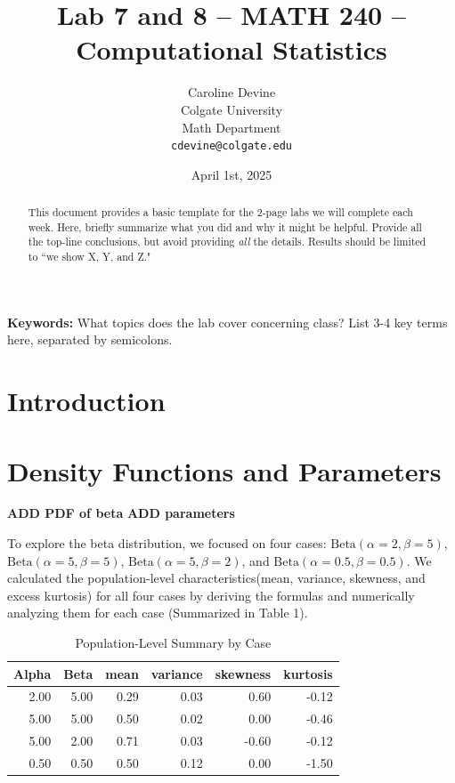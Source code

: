 \documentclass{article}\usepackage[]{graphicx}\usepackage[]{xcolor}
\begin{document}
\vspace{-1in}
\title{Lab 7 and 8 -- MATH 240 -- Computational Statistics}

\author{
  Caroline Devine \\
  Colgate University  \\
  Math Department  \\
  {\tt cdevine@colgate.edu}
}

\date{April 1st, 2025}

\maketitle

\begin{multicols}{2}
\begin{abstract}
This document provides a basic template for the 2-page labs we will complete each week. Here, briefly summarize what you did and why it might be helpful. Provide all the top-line conclusions, but avoid providing \emph{all} the details. Results should be limited to ``we show X, Y, and Z."
\end{abstract}

\noindent \textbf{Keywords:} What topics does the lab cover concerning class? List 3-4 key terms here, separated by semicolons.

\section{Introduction}



\section{Density Functions and Parameters}
\textbf{ADD PDF of beta}
\textbf{ADD parameters}

To explore the beta distribution, we focused on four cases: \(\text{Beta}(\alpha = 2, \beta = 5)\), \(\text{Beta}(\alpha = 5, \beta = 5)\), \(\text{Beta}(\alpha = 5, \beta = 2)\), and \(\text{Beta}(\alpha = 0.5, \beta = 0.5)\). We calculated the population-level characteristics(mean, variance, skewness, and excess kurtosis) for all four cases by deriving the formulas and numerically analyzing them for each case (Summarized in Table 1). 



\begin{table}[H]
\centering
\begingroup\small
\begin{tabular}{rrrrrr}
  \hline
Alpha & Beta & mean & variance & skewness & kurtosis \\ 
  \hline
2.00 & 5.00 & 0.29 & 0.03 & 0.60 & -0.12 \\ 
  5.00 & 5.00 & 0.50 & 0.02 & 0.00 & -0.46 \\ 
  5.00 & 2.00 & 0.71 & 0.03 & -0.60 & -0.12 \\ 
  0.50 & 0.50 & 0.50 & 0.12 & 0.00 & -1.50 \\ 
   \hline
\end{tabular}
\endgroup
\caption{Population-Level Summary by Case} 
\label{Table 1}
\end{table}


\end{multicols}
\end{document}
